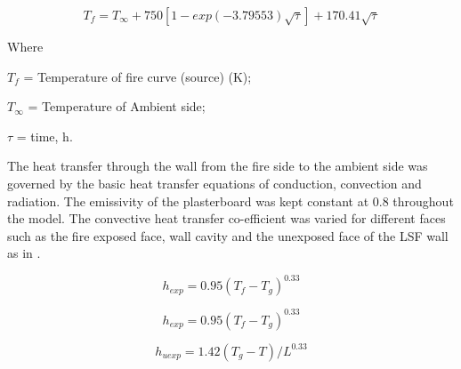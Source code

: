 \begin{equation} \label{eq:sultan1996}
T_f = T_\infty + 750 [1-exp(-3.79553)\sqrt{\tau}] + 170.41\sqrt{\tau}
\end{equation}

Where
\begin{description}[itemsep=0pt,parsep=0pt]
	\item $T_f$ = Temperature of fire curve (source) (\degree K);
	\item $T_\infty$ = Temperature of Ambient side;
	\item $\tau$ = time, h.
\end{description}
The heat transfer through the wall from the fire side to the ambient side was governed by the basic heat transfer equations of conduction, convection and radiation. The emissivity of the plasterboard was kept constant at 0.8 throughout the model. The convective heat transfer co-efficient was varied for different faces such as the fire exposed face, wall cavity and the unexposed face of the LSF wall as in .

\begin{equation}\label{eq:hexp}
h_{exp} = 0.95{(T_f - T_g)}^{0.33}
\end{equation}

\begin{equation}\label{eq:hcav}
h_{exp} = 0.95{(T_f - T_g)}^{0.33}
\end{equation}

\begin{equation}\label{eq:huexp}
h_{uexp} = 1.42{(T_g - T)}/L^{0.33}
\end{equation}

